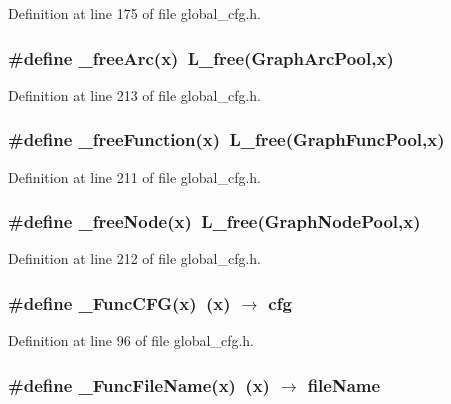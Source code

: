 Definition at line 175 of file global\_\-cfg.h.
\subsubsection{\setlength{\rightskip}{0pt plus 5cm}\#define \_\-free\-Arc(x)~\bf{L\_\-free}(\bf{Graph\-Arc\-Pool},x)}\label{global__cfg_8h_1b688654d54d43f13db9dc680f17b728}




Definition at line 213 of file global\_\-cfg.h.
\subsubsection{\setlength{\rightskip}{0pt plus 5cm}\#define \_\-free\-Function(x)~\bf{L\_\-free}(\bf{Graph\-Func\-Pool},x)}\label{global__cfg_8h_cb1bd8ea9c53917b023a0d2842a03c00}




Definition at line 211 of file global\_\-cfg.h.
\subsubsection{\setlength{\rightskip}{0pt plus 5cm}\#define \_\-free\-Node(x)~\bf{L\_\-free}(\bf{Graph\-Node\-Pool},x)}\label{global__cfg_8h_a5e97c37cc9afea4a3d4f6deffca79c8}




Definition at line 212 of file global\_\-cfg.h.
\subsubsection{\setlength{\rightskip}{0pt plus 5cm}\#define \_\-Func\-CFG(x)~(x) $\rightarrow$ cfg}\label{global__cfg_8h_1424106b35b5bdfebfd00238f3c5fecc}




Definition at line 96 of file global\_\-cfg.h.
\subsubsection{\setlength{\rightskip}{0pt plus 5cm}\#define \_\-Func\-File\-Name(x)~(x) $\rightarrow$ file\-Name}\label{global__cfg_8h_f41e71f59927b042b1b92ee95c45a2e5}





